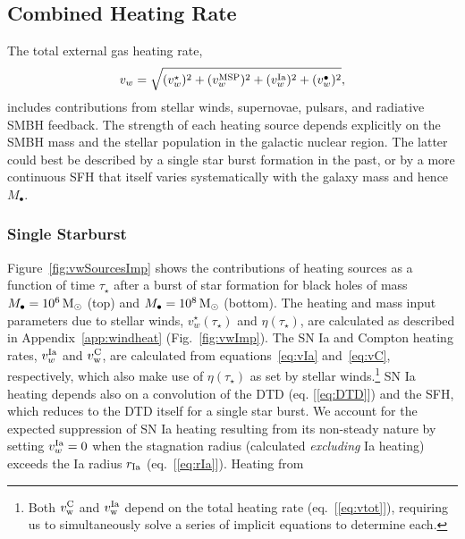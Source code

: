 \documentclass[usenatbib,fleqn]{mn2e}
\newcommand{\rb}{r_b}
\newcommand{\Mbh}[1][]{M_{\bullet#1}}
\newcommand{\Mbheight}{M_{\bullet,8}}
\newcommand{\rinf}{r_{\rm inf}}
\newcommand{\vwO}{v_{w}}
\begin{document}
\begin{figure}

\end{figure}






\subsection{Combined Heating Rate} 
\label{sec:combined}


The total external gas heating rate, 
\begin{equation}
\vwO = \sqrt{(v_{w}^{\star})^{2} + (v_{w}^{\rm MSP})^{2} + (v_{w}^{\rm Ia})^{2} + (v_{w}^{\bullet})^{2}},
\label{eq:vtot}
\end{equation}
includes contributions from stellar winds, supernovae, pulsars, and
radiative SMBH feedback.  The strength of each heating source depends
explicitly on the SMBH mass and the stellar population in the galactic
nuclear region.  The latter could best be
described by a single star burst formation in the past, or by a more
continuous SFH that itself varies systematically
with the galaxy mass and hence $\Mbh$.

\subsubsection{Single Starburst}

Figure~\ref{fig:vwSourcesImp} shows the contributions of heating sources as a function of time $\tau_{\star}$ after a burst of
star formation for black holes of mass $\Mbh = 10^{6} \Msun$ (top) and $\Mbh = 10^{8} \Msun$ (bottom). The heating and mass
input parameters due to stellar winds, $v_{w}^{\star}(\tau_{\star})$
and $\eta(\tau_{\star})$, are calculated as described in
Appendix~\ref{app:windheat} (Fig.~\ref{fig:vwImp}).  The SN Ia and Compton heating rates, $v_{w}^{\rm Ia}$ and $v_{\rm w}^{\rm C}$, are
calculated from equations~\eqref{eq:vIa} and~\eqref{eq:vC},
respectively, which also make use of $\eta(\tau_{\star})$ as set by stellar winds.\footnote{Both $v_{\rm w}^{\rm C}$ and
$v_{\rm w}^{\rm Ia}$ depend on the total heating rate
(eq.~[\ref{eq:vtot}]), requiring us to simultaneously solve a series
of implicit equations to determine each.}  SN Ia heating depends also on a convolution of the DTD (eq. [\ref{eq:DTD}]) and the SFH, which reduces to the DTD itself for a single star burst.  We account for the expected suppression of SN Ia heating resulting from its non-steady nature by setting $v_{w}^{\rm Ia} = 0$ when the stagnation radius (calculated {\it excluding} Ia heating) exceeds
the Ia radius $r_{\rm Ia}$ (eq.~[\ref{eq:rIa}]).  
Heating from
\end{document}
